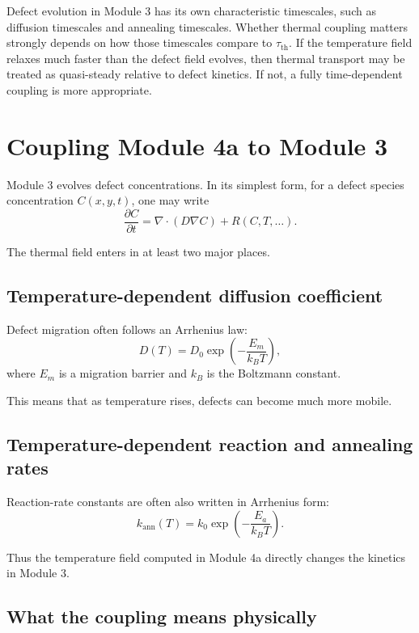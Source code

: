 \documentclass[11pt]{article}
\newcommand{\ann}{k_{\mathrm{ann}}}
\begin{document}
Defect evolution in Module 3 has its own characteristic timescales, such as diffusion timescales and annealing timescales. Whether thermal coupling matters strongly depends on how those timescales compare to $\tau_{\mathrm{th}}$. If the temperature field relaxes much faster than the defect field evolves, then thermal transport may be treated as quasi-steady relative to defect kinetics. If not, a fully time-dependent coupling is more appropriate.

\section{Coupling Module 4a to Module 3}

Module 3 evolves defect concentrations. In its simplest form, for a defect species concentration $C(x,y,t)$, one may write
\begin{equation}
\frac{\partial C}{\partial t} = \nabla \cdot (D\nabla C) + R(C,T,\ldots).
\end{equation}

The thermal field enters in at least two major places.

\subsection{Temperature-dependent diffusion coefficient}

Defect migration often follows an Arrhenius law:
\begin{equation}
D(T) = D_0 \exp\left(-\frac{E_m}{k_B T}\right),
\end{equation}
where $E_m$ is a migration barrier and $k_B$ is the Boltzmann constant.

This means that as temperature rises, defects can become much more mobile.

\subsection{Temperature-dependent reaction and annealing rates}

Reaction-rate constants are often also written in Arrhenius form:
\begin{equation}
\ann(T) = k_0 \exp\left(-\frac{E_a}{k_B T}\right).
\end{equation}

Thus the temperature field computed in Module 4a directly changes the kinetics in Module 3.

\subsection{What the coupling means physically}
\end{document}
